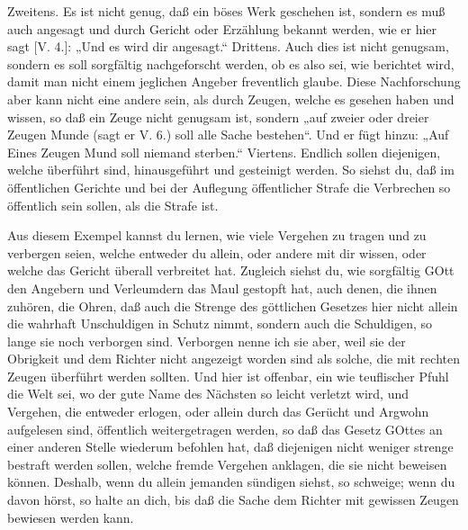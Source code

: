 Zweitens. Es ist nicht genug, daß ein böses Werk geschehen ist, sondern es muß auch angesagt und durch Gericht oder Erzählung bekannt werden, wie er hier sagt [V. 4.]: „Und es wird dir angesagt.“ Drittens. Auch dies ist nicht genugsam, sondern es soll sorgfältig nachgeforscht werden, ob es also sei, wie berichtet wird, damit man nicht einem jeglichen Angeber freventlich glaube. Diese Nachforschung aber kann nicht eine andere sein, als durch Zeugen, welche es gesehen haben und wissen, so daß ein Zeuge nicht genugsam ist, sondern „auf zweier oder dreier Zeugen Munde (sagt er V. 6.) soll alle Sache bestehen“. Und er fügt hinzu: „Auf Eines Zeugen Mund soll niemand sterben.“ Viertens. Endlich sollen diejenigen, welche überführt sind, hinausgeführt und gesteinigt werden. So siehst du, daß im öffentlichen Gerichte und bei der Auflegung öffentlicher Strafe die Verbrechen so öffentlich sein sollen, als die Strafe ist.

Aus diesem Exempel kannst du lernen, wie viele Vergehen zu tragen und zu verbergen seien, welche entweder du allein, oder andere mit dir wissen, oder welche das Gericht überall verbreitet hat. Zugleich siehst du, wie sorgfältig GOtt den Angebern und Verleumdern das Maul gestopft hat, auch denen, die ihnen zuhören, die Ohren, daß auch die Strenge des göttlichen Gesetzes hier nicht allein die wahrhaft Unschuldigen in Schutz nimmt, sondern auch die Schuldigen, so lange sie noch verborgen sind. Verborgen nenne ich sie aber, weil sie der Obrigkeit und dem Richter nicht angezeigt worden sind als solche, die mit rechten Zeugen überführt werden sollten. Und hier ist offenbar, ein wie teuflischer Pfuhl die Welt sei, wo der gute Name des Nächsten so leicht verletzt wird, und Vergehen, die entweder erlogen, oder allein durch das Gerücht und Argwohn aufgelesen sind, öffentlich weitergetragen werden, so daß das Gesetz GOttes an einer anderen Stelle wiederum befohlen hat, daß diejenigen nicht weniger strenge bestraft werden sollen, welche fremde Vergehen anklagen, die sie nicht beweisen können. Deshalb, wenn du allein jemanden sündigen siehst, so schweige; wenn du davon hörst, so halte an dich, bis daß die Sache dem Richter mit gewissen Zeugen bewiesen werden kann.


